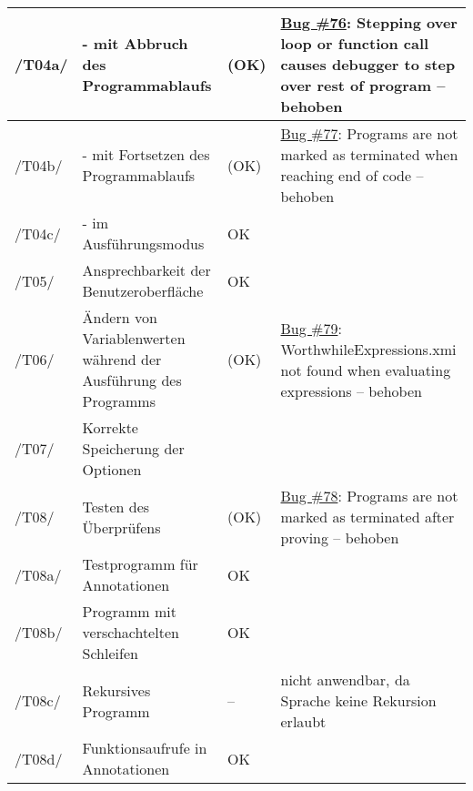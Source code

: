 \begin{landscape}
\begin{longtable}{lp{8cm}lp{10cm}}
/T04a/ &  - mit Abbruch des Programmablaufs & (OK) & \href{https://github.com/team-worthwhile/worthwhile/issues/76}{Bug \#76}: Stepping over loop or function call causes debugger to step over rest of program -- behoben \\ \midrule
/T04b/ &  - mit Fortsetzen des Programmablaufs & (OK) & \href{https://github.com/team-worthwhile/worthwhile/issues/77}{Bug \#77}: Programs are not marked as terminated when reaching end of code -- behoben \\ \midrule
/T04c/ &  - im Ausführungsmodus & OK &  \\ \midrule
\midrule
/T05/ & Ansprechbarkeit der Benutzeroberfläche & OK &  \\ \midrule
\midrule
/T06/ & Ändern von Variablenwerten während der Ausführung des Programms & (OK) & \href{https://github.com/team-worthwhile/worthwhile/issues/79}{Bug \#79}: WorthwhileExpressions.xmi not found when evaluating expressions -- behoben \\ \midrule
\midrule
/T07/ & Korrekte Speicherung der Optionen &  &  \\ \midrule
\midrule
/T08/ & Testen des Überprüfens & (OK) & \href{https://github.com/team-worthwhile/worthwhile/issues/78}{Bug \#78}: Programs are not marked as terminated after proving -- behoben\\ \midrule
/T08a/ & Testprogramm für Annotationen & OK &  \\ \midrule
/T08b/ & Programm mit verschachtelten Schleifen & OK &  \\ \midrule
/T08c/ & Rekursives Programm & -- & nicht anwendbar, da Sprache keine Rekursion erlaubt \\ \midrule
/T08d/ & Funktionsaufrufe in Annotationen & OK &  \\

\bottomrule
\bottomrule
\end{longtable}


\end{landscape}